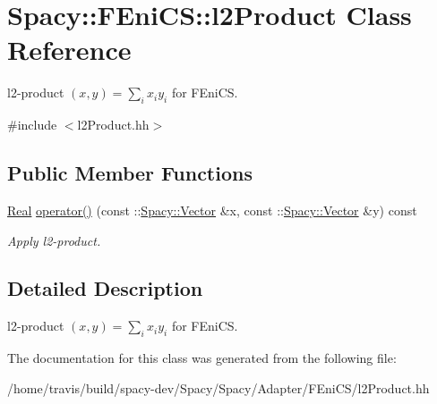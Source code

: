 \hypertarget{classSpacy_1_1FEniCS_1_1l2Product}{\section{\-Spacy\-:\-:\-F\-Eni\-C\-S\-:\-:l2\-Product \-Class \-Reference}
\label{classSpacy_1_1FEniCS_1_1l2Product}
}


l2-\/product $(x,y) = \sum_i x_i y_i $ for \-F\-Eni\-C\-S.  




{\ttfamily \#include $<$l2\-Product.\-hh$>$}

\subsection*{\-Public \-Member \-Functions}
\begin{DoxyCompactItemize}
\item 
\hypertarget{classSpacy_1_1FEniCS_1_1l2Product_a795fc0d8cbced556168163265ac21406}{\hyperlink{classSpacy_1_1Real}{\-Real} \hyperlink{classSpacy_1_1FEniCS_1_1l2Product_a795fc0d8cbced556168163265ac21406}{operator()} (const \-::\hyperlink{classSpacy_1_1Vector}{\-Spacy\-::\-Vector} \&x, const \-::\hyperlink{classSpacy_1_1Vector}{\-Spacy\-::\-Vector} \&y) const }\label{classSpacy_1_1FEniCS_1_1l2Product_a795fc0d8cbced556168163265ac21406}

\begin{DoxyCompactList}\small\item\em \-Apply l2-\/product. \end{DoxyCompactList}\end{DoxyCompactItemize}


\subsection{\-Detailed \-Description}
l2-\/product $(x,y) = \sum_i x_i y_i $ for \-F\-Eni\-C\-S. 

\-The documentation for this class was generated from the following file\-:\begin{DoxyCompactItemize}
\item 
/home/travis/build/spacy-\/dev/\-Spacy/\-Spacy/\-Adapter/\-F\-Eni\-C\-S/l2\-Product.\-hh\end{DoxyCompactItemize}
